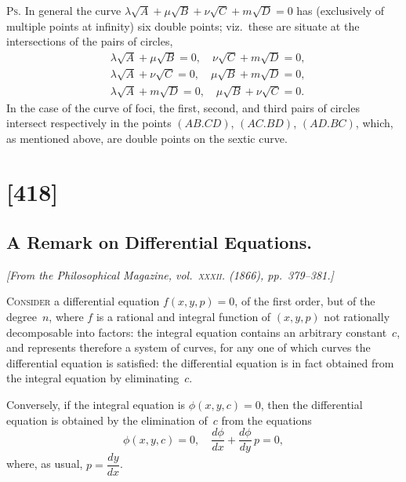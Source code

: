\documentclass[11pt,a4paper]{article}
\theoremstyle{plain}
\theoremstyle{definition}
\begin{document}
\textsc{Ps.}  In general the curve
$\lambda\sqrt{A} + \mu\sqrt{B} + \nu\sqrt{C} + m\sqrt{D} = 0$
has (exclusively of multiple points at infinity) six double points; viz.\ these
are situate at the intersections of the pairs of circles,
\begin{align*}
&\lambda\sqrt{A} + \mu\sqrt{B} = 0, \quad \nu\sqrt{C} + m\sqrt{D} = 0, \\
&\lambda\sqrt{A} + \nu\sqrt{C} = 0, \quad \mu\sqrt{B} + m\sqrt{D} = 0, \\
&\lambda\sqrt{A} + m\sqrt{D} = 0, \quad \mu\sqrt{B} + \nu\sqrt{C} = 0.
\end{align*}
In the case of the curve of foci, the first, second, and third pairs of circles
intersect respectively in the points $(AB.CD)$, $(AC.BD)$, $(AD.BC)$, which,
as mentioned above, are double points on the sextic curve.

\clearpage

\section{[418]}
\subsection{A Remark on Differential Equations.}

\begin{center}
\textit{[From the Philosophical Magazine, vol.~\textsc{xxxii}. (1866), pp.~379--381.]}
\end{center}

\textsc{Consider} a differential equation $f(x,y,p)=0$, of the first order, but of the
degree~$n$, where $f$ is a rational and integral function of $(x,y,p)$ not rationally
decomposable into factors: the integral equation contains an arbitrary constant~$c$,
and represents therefore a system of curves, for any one of which curves the
differential equation is satisfied: the differential equation is in fact obtained from
the integral equation by eliminating~$c$.

Conversely, if the integral equation is $\phi(x,y,c)=0$, then the differential
equation is obtained by the elimination of~$c$ from the equations
\[
\phi(x,y,c)=0, \quad \frac{d\phi}{dx} + \frac{d\phi}{dy}\,p = 0,
\]
where, as usual, $p = \dfrac{dy}{dx}$.
\end{document}

